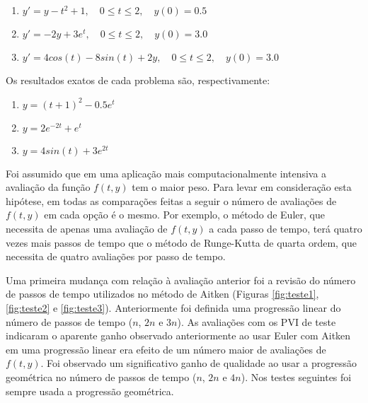 \documentclass[final,5p]{elsarticle}
\numberwithin{equation}{section}
\begin{document}
        \begin{enumerate}
            \item $y' = y - t^2 + 1, \quad 0 \leq t \leq  2, \quad y(0) = 0.5$ \label{item:pvi1}
            \item $y' = -2y + 3 e^t, \quad 0 \leq t \leq  2, \quad y(0) = 3.0$ \label{item:pvi2}
            \item $y' = 4 cos(t) - 8 sin(t) + 2 y, \quad 0 \leq t \leq  2, \quad y(0) = 3.0$ \label{item:pvi3}
        \end{enumerate}

        Os resultados exatos de cada problema são, respectivamente:

        \begin{enumerate}
            \item $y = (t+1)^2 - 0.5 e^t$
            \item $y = 2 e^{-2 t} + e^t$
            \item $y = 4 sin(t) + 3 e^{2 t}$
        \end{enumerate}

        Foi assumido que em uma aplicação mais computacionalmente intensiva a avaliação da função $f(t,y)$ tem o maior peso. Para levar em consideração esta hipótese, em todas as comparações feitas a seguir o número de avaliações de $f(t,y)$ em cada opção é o mesmo. Por exemplo, o método de Euler, que necessita de apenas uma avaliação de $f(t,y)$ a cada passo de tempo, terá quatro vezes mais passos de tempo que o método de Runge-Kutta de quarta ordem, que necessita de quatro avaliações por passo de tempo.

        Uma primeira mudança com relação à avaliação anterior foi a revisão do número de passos de tempo utilizados no método de Aitken (Figuras \ref{fig:teste1}, \ref{fig:teste2} e \ref{fig:teste3}). Anteriormente foi definida uma progressão linear do número de passos de tempo ($n$, $2 n$ e $3 n$). As avaliações com os PVI de teste indicaram o aparente ganho observado anteriormente ao usar Euler com Aitken em uma progressão linear era efeito de um número maior de avaliações de $f(t,y)$. Foi observado um significativo ganho de qualidade ao usar a progressão geométrica no número de passos de tempo ($n$, $2 n$ e $4 n$). Nos testes seguintes foi sempre usada a progressão geométrica.
\end{document}
